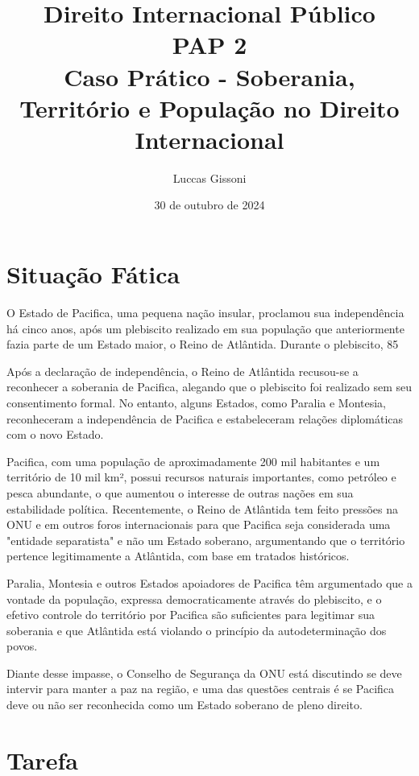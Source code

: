 \documentclass{article}
\title{%
  Direito Internacional Público \\
  \Large PAP 2\\
  \Large Caso Prático - Soberania, Território e População no Direito Internacional\\
  }
\author{Luccas Gissoni}
\date{30 de outubro de 2024}
\begin{document}
\maketitle

\section{Situação Fática}

O Estado de Pacifica, uma pequena nação insular, proclamou sua independência há cinco anos, após um plebiscito realizado em sua população que anteriormente fazia parte de um Estado maior, o Reino de Atlântida. Durante o plebiscito, 85%

Após a declaração de independência, o Reino de Atlântida recusou-se a reconhecer a soberania de Pacifica, alegando que o plebiscito foi realizado sem seu consentimento formal. No entanto, alguns Estados, como Paralia e Montesia, reconheceram a independência de Pacifica e estabeleceram relações diplomáticas com o novo Estado.

Pacifica, com uma população de aproximadamente 200 mil habitantes e um território de 10 mil km², possui recursos naturais importantes, como petróleo e pesca abundante, o que aumentou o interesse de outras nações em sua estabilidade política. Recentemente, o Reino de Atlântida tem feito pressões na ONU e em outros foros internacionais para que Pacifica seja considerada uma "entidade separatista" e não um Estado soberano, argumentando que o território pertence legitimamente a Atlântida, com base em tratados históricos.

Paralia, Montesia e outros Estados apoiadores de Pacifica têm argumentado que a vontade da população, expressa democraticamente através do plebiscito, e o efetivo controle do território por Pacifica são suficientes para legitimar sua soberania e que Atlântida está violando o princípio da autodeterminação dos povos.

Diante desse impasse, o Conselho de Segurança da ONU está discutindo se deve intervir para manter a paz na região, e uma das questões centrais é se Pacifica deve ou não ser reconhecida como um Estado soberano de pleno direito.

\section{Tarefa}
\end{document}
